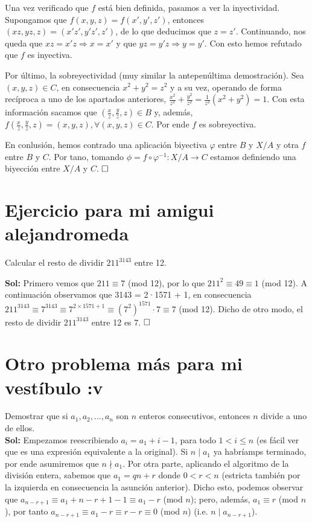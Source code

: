 \documentclass{article}
\begin{document}
Una vez verificado que $f$ está bien definida, pasamos a ver la inyectividad. Supongamos que $f(x, y, z) = f(x', y', z')$, entonces $(xz, yz, z) = (x'z', y'z', z')$, de lo que deducimos que $z = z'$. Continuando, nos queda que $xz = x'z \Longrightarrow x = x'$ y que $yz = y'z \Longrightarrow y = y'$. Con esto hemos refutado que $f$ es inyectiva.

Por último, la sobreyectividad (muy similar la antepenúltima demostración). Sea $(x, y, z) \in C$, en consecuencia $x^2 + y^2 = z^2$ y a su vez, operando de forma recíproca a uno de los apartados anteriores, $\frac{x^2}{z^2} + \frac{y^2}{z^2} = \frac{1}{z^2}(x^2 + y^2) = 1$. Con esta información sacamos que $(\frac{x}{z}, \frac{y}{z}, z) \in B$ y, además, $f(\frac{x}{z}, \frac{y}{z}, z) = (x, y, z), \forall (x, y, z) \in C$. Por ende $f$ es sobreyectiva.

En conlusión, hemos contrado una aplicación biyectiva $\varphi$ entre $B$ y $X/A$ y otra $f$ entre $B$ y $C$. Por tano, tomando $\phi = f \circ \varphi^{-1} : X/A \longrightarrow C$ estamos definiendo una biyección entre $X/A$ y $C$. $\hfill\square$

\newpage

\section{Ejercicio para mi amigui alejandromeda}

Calcular el resto de dividir $211^{3143}$ entre 12.

\noindent\textbf{Sol:} Primero vemos que $211 \equiv 7$ (mod 12), por lo que $211^2 \equiv 49 \equiv 1$ (mod 12). A continuación observamos que 3143 = 2·1571 + 1, en consecuencia $211^{3143} \equiv 7^{3143} \equiv 7^{2\times1571 + 1} \equiv (7^2)^{1571}·7 \equiv 7$ (mod 12). Dicho de otro modo, el resto de dividir $211^{3143}$ entre 12 es 7. $\hfill\square$

\newpage

\section{Otro problema más para mi vestíbulo :v}

Demostrar que si $a_1, a_2, ..., a_n$ son $n$ enteros consecutivos, entonces $n$ divide a uno de ellos. \\

\noindent\textbf{Sol:} Empezamos reescribiendo $a_i = a_1 + i - 1$, para todo $1 < i \leq n$ (es fácil ver que es una expresión equivalente a la original). Si $n \mid a_1$ ya habríamps terminado, por ende asumiremos que $n \nmid a_1$. Por otra parte, aplicando el algoritmo de la división entera, sabemos que $a_1 = qn + r$ donde $0 < r < n$ (estricta también por la izquierda en consecuencia la asunción anterior). Dicho esto, podemos observar que $a_{n - r + 1} \equiv a_1 + n - r + 1 - 1 \equiv a_1 - r$ (mod $n$); pero, además, $a_1 \equiv r$ (mod $n$), por tanto $a_{n - r + 1} \equiv a_1 - r \equiv r - r \equiv 0$ (mod $n$) (i.e. $n \mid a_{n - r + 1}$). 
\end{document}
